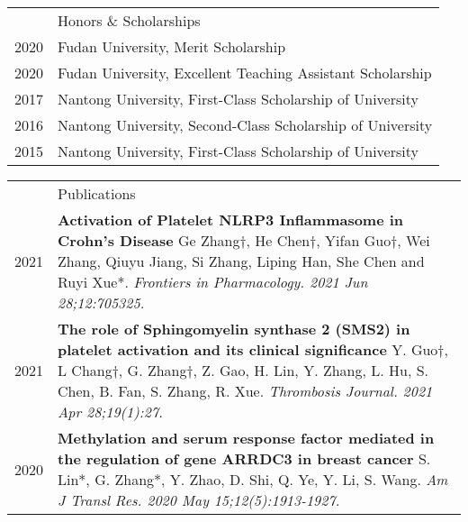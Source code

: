 \documentclass[letterpaper, 11pt]{article}
\newcommand{\headingfont}{\Large\color{LimeGreen}}
\newenvironment{SectionTable}[1]{
	\renewcommand*{\arraystretch}{1.7}
	\setlength{\tabcolsep}{10pt}
	\begin{longtable}{Rp{5.2in}} & #1 \\}
{\end{longtable}\vspace{-.3cm}}
\newenvironment{SectionTableSingleSpace}[1]{
	\renewcommand*{\arraystretch}{1.2}
	\setlength{\tabcolsep}{10pt}
	\begin{longtable}{Rp{5.2in}} & #1 \\[0.6em]}
{\end{longtable}\vspace{-.3cm}}
\begin{document}

\begin{SectionTableSingleSpace}{\headingfont Honors \& Scholarships}
2020 & 
Fudan University, Merit Scholarship \\

2020 &
Fudan University, Excellent Teaching Assistant Scholarship \\

2017 &
Nantong University, First-Class Scholarship of University \\

2016 &
Nantong University, Second-Class Scholarship of University  \\

2015 &
Nantong University, First-Class Scholarship of University 
\end{SectionTableSingleSpace}


\begin{SectionTable}{\headingfont Publications} 
2021 & 
\textbf{Activation of Platelet NLRP3 Inflammasome in Crohn's Disease} \newline
Ge Zhang†, He Chen†, Yifan Guo†, Wei Zhang, Qiuyu Jiang, Si Zhang, Liping Han, She Chen and Ruyi Xue*. \newline
\textit{Frontiers in Pharmacology. 2021 Jun 28;12:705325.} \\

2021 & 
\textbf{The role of Sphingomyelin synthase 2 (SMS2) in platelet activation and its clinical significance} \newline
Y. Guo†, L Chang†, G. Zhang†, Z. Gao, H. Lin, Y. Zhang, L. Hu, S. Chen, B. Fan, S. Zhang, R. Xue. \newline
\textit{Thrombosis Journal. 2021 Apr 28;19(1):27.} \\

2020 & 
\textbf{Methylation and serum response factor mediated in the regulation of gene ARRDC3 in breast cancer} \newline
S. Lin*, G. Zhang*, Y. Zhao, D. Shi, Q. Ye, Y. Li, S. Wang. \newline
\textit{Am J Transl Res. 2020 May 15;12(5):1913-1927.}
\end{SectionTable}

\end{document}
